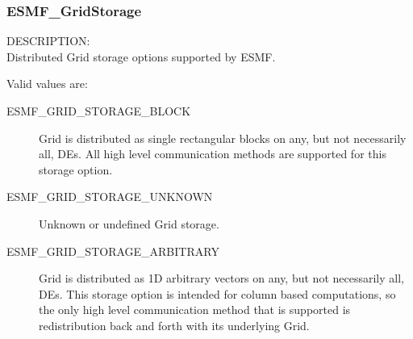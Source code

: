  \subsubsection{ESMF\_GridStorage}
 
 {\sf DESCRIPTION:\\}
 Distributed Grid storage options supported by ESMF.
 
 Valid values are:
 \begin{description}
    \item [ESMF\_GRID\_STORAGE\_BLOCK]
          Grid is distributed as single rectangular blocks on any, but not
          necessarily all, DEs.  All high level communication methods are
          supported for this storage option.

    \item [ESMF\_GRID\_STORAGE\_UNKNOWN]
          Unknown or undefined Grid storage.

    \item [ESMF\_GRID\_STORAGE\_ARBITRARY]
          Grid is distributed as 1D arbitrary vectors on any, but not
          necessarily all, DEs.  This storage option is intended for
          column based computations, so the only high level communication
          method that is supported is redistribution back and forth with
          its underlying Grid.
 
 \end{description}


% 
% 
% 
% 


